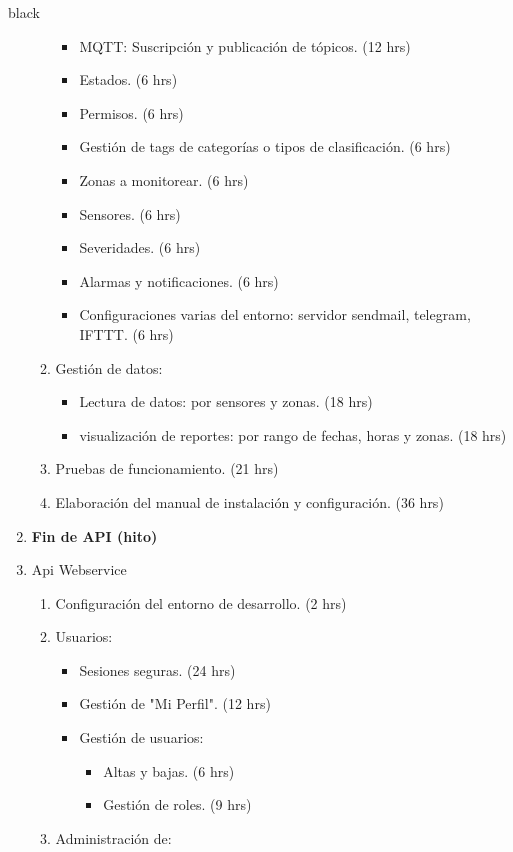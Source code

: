 \documentclass[11pt]{charter}
\begin{document}
\begin{consigna}{black}
\begin{enumerate}
\begin{enumerate}
			\begin{itemize}
				\item MQTT: Suscripción y publicación de tópicos. (12 hrs) 
				\item Estados. (6 hrs)
				\item Permisos. (6 hrs)  
				\item Gestión de tags de categorías o tipos de clasificación. (6 hrs) 
				\item Zonas a monitorear. (6 hrs) 
				\item Sensores. (6 hrs)
 				\item Severidades. (6 hrs)
				\item Alarmas y notificaciones. (6 hrs) 
				\item Configuraciones varias del entorno: servidor sendmail, telegram, IFTTT. (6 hrs)
			\end{itemize}
		\item Gestión de datos:
			\begin{itemize}
				\item Lectura de datos: por sensores y zonas. (18 hrs) 
				\item visualización de reportes: por rango de fechas, horas y zonas. (18 hrs) 
			\end{itemize}
		\item Pruebas de funcionamiento. (21 hrs) 
		\item Elaboración del manual de instalación y configuración. (36 hrs)  	
	\end{enumerate}
\item \textbf{Fin de API (hito)} 	
\item Api Webservice
	\begin{enumerate}
		\item Configuración del entorno de desarrollo. (2 hrs)
		\item Usuarios:
			\begin{itemize}
				\item Sesiones seguras. (24 hrs)
				\item Gestión de "Mi Perfil". (12 hrs)
				\item Gestión de usuarios:
				\begin{itemize}
					\item Altas y bajas. (6 hrs) 
					\item Gestión de roles. (9 hrs)
				\end{itemize}
			\end{itemize}
		\item Administración de:

\end{enumerate}
\end{enumerate}
\end{consigna}
\end{document}
